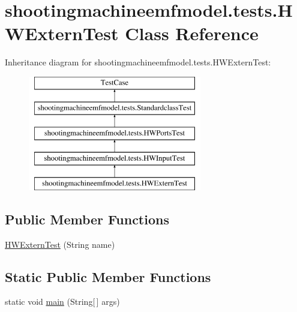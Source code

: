 \hypertarget{classshootingmachineemfmodel_1_1tests_1_1_h_w_extern_test}{\section{shootingmachineemfmodel.\-tests.\-H\-W\-Extern\-Test Class Reference}
\label{classshootingmachineemfmodel_1_1tests_1_1_h_w_extern_test}
}
Inheritance diagram for shootingmachineemfmodel.\-tests.\-H\-W\-Extern\-Test\-:\begin{figure}[H]
\begin{center}
\leavevmode
\includegraphics[height=5.000000cm]{classshootingmachineemfmodel_1_1tests_1_1_h_w_extern_test}
\end{center}
\end{figure}
\subsection*{Public Member Functions}
\begin{DoxyCompactItemize}
\item 
\hyperlink{classshootingmachineemfmodel_1_1tests_1_1_h_w_extern_test_a6ecb10af9985de52d204d3bc414c4de9}{H\-W\-Extern\-Test} (String name)
\end{DoxyCompactItemize}
\subsection*{Static Public Member Functions}
\begin{DoxyCompactItemize}
\item 
static void \hyperlink{classshootingmachineemfmodel_1_1tests_1_1_h_w_extern_test_ad38dbfe6a45b04f9b68b63a64595d8b8}{main} (String\mbox{[}$\,$\mbox{]} args)
\end{DoxyCompactItemize}
